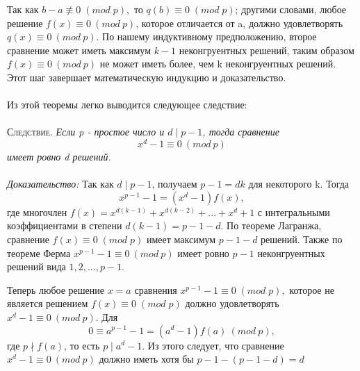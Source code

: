 \documentclass[twoside,12pt]{article}
\begin{document}
{Так как $b-a\not\equiv0\;(mod\;p),$ то $q(b)\equiv0\;(mod\;p)$; другими словами, любое решение $f(x)\equiv0\:(mod\:p)$, которое отличается от a, должно удовлетворять $q(x)\equiv0\:(mod\:p)$. По нашему индуктивному предположению, второе сравнение может иметь максимум $k-1$ неконгруентных решений, таким образом $f(x)\equiv0\:(mod\:p)$ не может иметь более, чем k неконгруентных решений. Этот шаг завершает математическую индукцию и доказательство.
\\\\
Из этой теоремы легко выводится следующее следствие:
\\\\
\textsc{Следствие.} \textit{Если p - простое число и $d\mid p-1$, тогда сравнение $$x^{d}-1\equiv0\:(mod\:p)$$ имеет  ровно d решений.}
\\\\
\textit{Доказательство:} Так как $d\mid p-1$, получаем $p-1=dk$ для некоторого k. Тогда $$x^{p-1}-1=(x^{d}-1)f(x),$$
где многочлен $f(x)=x^{d(k-1)}+x^{d(k-2)}+...+x^{d}+1$ с интегральными коэффициентами в степени $d(k-1)=p-1-d.$	По теореме Лагранжа, сравнение $f(x)\equiv0\;(mod\;p)$ имеет максимум $p-1-d$ решений. Также по теореме Ферма $x^{p-1}-1\equiv0\:(mod\:p)$ имеет ровно $p-1$ неконгруентных решений вида $1,2,...,p-1.$ \par
Теперь любое решение $x=a$ сравнения $x^{p-1}-1\equiv0\;(mod\;p),$ которое не является решением $f(x)\equiv0\;(mod\;p)$ должно удовлетворять $x^{d}-1\equiv0\:(mod\:p)$. Для $$0\equiv a^{p-1}-1=(a^{d}-1)f(a)\:(mod\:p),$$ 
где $p\nmid f(a)$, то есть $p\mid a^{d}-1.$ Из этого следует, что сравнение $x^{d}-1\equiv0\:(mod\:p)$ должно иметь хотя бы $p-1-(p-1-d)=d$
}
\end{document}
